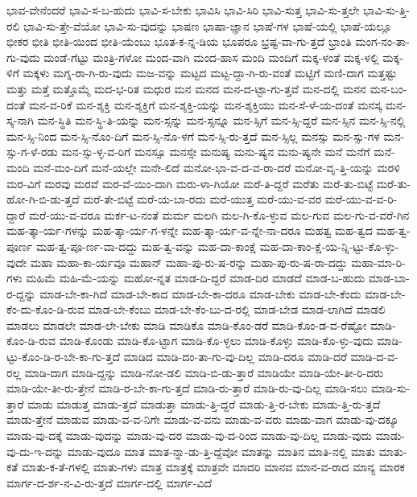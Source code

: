 {ಭಾವ-ವೇನೆಂದರೆ
ಭಾವಿ-ಸ-ಬ-ಹುದು
ಭಾವಿ-ಸ-ಬೇಕು
ಭಾವಿಸಿ
ಭಾವಿ-ಸಿರಿ
ಭಾವಿ-ಸುತ್ತ
ಭಾವಿ-ಸು-ತ್ತಲೇ
ಭಾವಿ-ಸು-ತ್ತಿ-ರಲಿ
ಭಾವಿ-ಸು-ತ್ತೇ-ವೆಯೋ
ಭಾವಿ-ಸು-ವುದನ್ನು
ಭಾಷಣ
ಭಾಷಾ-ಜ್ಞಾನ
ಭಾಷೆ-ಗಳ
ಭಾಷೆ-ಯಲ್ಲಿ
ಭಾಷೆ-ಯಲ್ಲೂ
ಭೀಕರ
ಭೀತಿ
ಭೀತಿ-ಯಿಂದ
ಭೀತಿ-ಯೆಂಬು
ಭೂತ-ಕ-ನ್ನ-ಡಿಯ
ಭೂಪರೂ
ಭ್ರಷ್ಟ-ವಾ-ಗು-ತ್ತದೆ
ಭ್ರಾಂತಿ
ಮಂಗ-ನಂ-ತಾ-ಗು-ವುದು
ಮಂಡೆ-ಗೆಟ್ಟು
ಮಂತ್ರಿ-ಗಳೋ
ಮಂದ-ವಾಗಿ
ಮಂದ-ಹಾಸ
ಮಂದಿ
ಮಂದಿಗೆ
ಮಕ್ಕ-ಳಂತೆ
ಮಕ್ಕ-ಳಲ್ಲಿ
ಮಕ್ಕ-ಳಿಗೆ
ಮಕ್ಕಳು
ಮಗ್ನ-ರಾ-ಗಿ-ರು-ವುದು
ಮಜ-ವನ್ನು
ಮಟ್ಟದ
ಮಟ್ಟ-ದ್ದಾ-ಗಿ-ರು-ವಂತೆ
ಮಟ್ಟಿಗೆ
ಮಣಿ-ದಾಗ
ಮತ್ತಷ್ಟು
ಮತ್ತು
ಮತ್ತೆ
ಮತ್ತೊಮ್ಮೆ
ಮದ-ಭ-ರಿತ
ಮಧುರ
ಮನ
ಮನದ
ಮನ-ದ-ಟ್ಟಾ-ಗು-ತ್ತವೆ
ಮನ-ದಲ್ಲಿ
ಮನನ
ಮನ-ಬಂ-ದಂತೆ
ಮನ-ವ-ರಿಕೆ
ಮನ-ಶ್ಶಕ್ತಿ
ಮನ-ಶ್ಶಕ್ತಿಗೆ
ಮನ-ಶ್ಶಕ್ತಿ-ಯನ್ನು
ಮನ-ಶ್ಶಕ್ತಿಯು
ಮನ-ಸೆ-ಳೆ-ಯ-ದಂತೆ
ಮನಸ್ಕ
ಮನ-ಸ್ಕ-ನಾಗಿ
ಮನ-ಸ್ಥಿತಿ
ಮನ-ಸ್ಥಿ-ತಿ-ಯನ್ನು
ಮನ-ಸ್ಸನ್ನು
ಮನ-ಸ್ಸನ್ನೂ
ಮನ-ಸ್ಸಿಗೆ
ಮನ-ಸ್ಸಿ-ದ್ದರೆ
ಮನ-ಸ್ಸಿನ
ಮನ-ಸ್ಸಿ-ನಲ್ಲಿ
ಮನ-ಸ್ಸಿ-ನಿಂದ
ಮನ-ಸ್ಸಿ-ನೊಂ-ದಿಗೆ
ಮನ-ಸ್ಸಿ-ನೊ-ಳಗೆ
ಮನ-ಸ್ಸಿ-ರು-ತ್ತದೆ
ಮನ-ಸ್ಸಿಲ್ಲ
ಮನಸ್ಸು
ಮನ-ಸ್ಸು-ಗಳ
ಮನ-ಸ್ಸು-ಗ-ಳೆ-ರಡು
ಮನ-ಸ್ಸು-ಳ್ಳ-ವ-ರಿಗೆ
ಮನಸ್ಸೂ
ಮನಸ್ಸೇ
ಮನುಷ್ಯ
ಮನು-ಷ್ಯನ
ಮನು-ಷ್ಯನೇ
ಮನೆ
ಮನೆಗೆ
ಮನೆ-ಮಂದಿ
ಮನೆ-ಮಂ-ದಿಗೆ
ಮನೆ-ಯಲ್ಲೇ
ಮನೇ-ಲಿದೆ
ಮನೋ-ಭಾ-ವ-ದ-ವ-ರಾ-ದರೆ
ಮನೋ-ವೃ-ತ್ತಿ-ಯನ್ನು
ಮರಳಿ
ಮರ-ವಿಗೆ
ಮರವು
ಮರವೆ
ಮರ-ವೆ-ಯಿಂ-ದಾಗಿ
ಮರು-ಳಾ-ಗಿಯೋ
ಮರೆ-ತಿ-ದ್ದರೆ
ಮರೆತು
ಮರೆ-ತು-ಬಿಟ್ಟೆ
ಮರೆ-ತು-ಹೋ-ಗಿ-ಬಿ-ಡು-ತ್ತದೆ
ಮರೆ-ತೇ-ಬಿಟ್ಟೆ
ಮರೆ-ಯ-ಬಾ-ರದು
ಮರೆ-ಯುತ್ತ
ಮರೆ-ಯು-ವ-ವರ
ಮರೆ-ಯು-ವ-ವ-ರಿ-ದ್ದಾರೆ
ಮರೆ-ಯು-ವ-ವರೂ
ಮರ್ಕ-ಟ-ನಂತೆ
ಮರ್ಮ
ಮಲಗಿ
ಮಲ-ಗಿ-ಕೊ-ಳ್ಳುವ
ಮಲ-ಗುವ
ಮಲ-ಗು-ವ-ವರೆ-ಗಿನ
ಮಹ-ತ್ಕಾ-ರ್ಯ-ಗಳನ್ನು
ಮಹ-ತ್ಕಾ-ರ್ಯ-ಗ-ಳನ್ನೇ
ಮಹ-ತ್ಕಾ-ರ್ಯ-ವ-ನ್ನೇ-ನಾ-ದರೂ
ಮಹತ್ವ
ಮಹ-ತ್ವದ
ಮಹ-ತ್ವ-ಪೂರ್ಣ
ಮಹ-ತ್ವ-ಪೂ-ರ್ಣ-ವಾ-ದದ್ದು
ಮಹ-ತ್ವ-ವನ್ನು
ಮಹ-ದಾ-ಕಾಂಕ್ಷೆ
ಮಹ-ದಾ-ಕಾಂ-ಕ್ಷೆ-ಯ-ನ್ನಿ-ಟ್ಟು-ಕೊ-ಳ್ಳು-ವುದೇ
ಮಹಾ
ಮಹಾ-ಕಾ-ರ್ಯವೂ
ಮಹಾನ್
ಮಹಾ-ಪು-ರು-ಷ-ರನ್ನು
ಮಹಾ-ಪು-ರು-ಷ-ರಾ-ದದ್ದು
ಮಹಾ-ಮಾ-ರಿ-ಗಳು
ಮಹಿಮೆ
ಮಹಿ-ಮೆ-ಯನ್ನು
ಮಹೋ-ನ್ನತ
ಮಾಡ-ದಿ-ದ್ದರೆ
ಮಾಡ-ದಿರ
ಮಾಡದೆ
ಮಾಡ-ಬ-ಹುದು
ಮಾಡ-ಬಾ-ರ-ದ್ದನ್ನು
ಮಾಡ-ಬೇ-ಕಾ-ಗಿದೆ
ಮಾಡ-ಬೇ-ಕಾದ
ಮಾಡ-ಬೇ-ಕಾ-ದರೂ
ಮಾಡ-ಬೇಕು
ಮಾಡ-ಬೇ-ಕೆಂದು
ಮಾಡ-ಬೇ-ಕೆಂ-ದು-ಕೊಂ-ಡಿ-ರುವ
ಮಾಡ-ಬೇ-ಕೆಂಬು
ಮಾಡ-ಬೇ-ಕೆಂ-ಬು-ದ-ರಲ್ಲಿ
ಮಾಡ-ಬೇಡ
ಮಾಡ-ಲಾಗಿದೆ
ಮಾಡಲಿ
ಮಾಡಲು
ಮಾಡಲೇ
ಮಾಡ-ಲೇ-ಬೇಕು
ಮಾಡಿ
ಮಾಡಿಕೊ
ಮಾಡಿ-ಕೊಂ-ಡರೆ
ಮಾಡಿ-ಕೊಂ-ಡ-ವ-ರೆಷ್ಟೋ
ಮಾಡಿ-ಕೊಂ-ಡಿ-ರುವ
ಮಾಡಿ-ಕೊಂಡು
ಮಾಡಿ-ಕೊ-ಟ್ಟಾಗ
ಮಾಡಿ-ಕೊ-ಳ್ಳಲು
ಮಾಡಿ-ಕೊಳ್ಳು
ಮಾಡಿ-ಕೊ-ಳ್ಳು-ವುದು
ಮಾಡಿ-ಟ್ಟು-ಕೊಂ-ಡಿ-ರ-ಬೇ-ಕಾ-ಗು-ತ್ತದೆ
ಮಾಡಿದ
ಮಾಡಿ-ದಂ-ತಾ-ಗು-ವು-ದಿಲ್ಲ
ಮಾಡಿ-ದರೂ
ಮಾಡಿ-ದರೆ
ಮಾಡಿ-ದ-ವ-ರಲ್ಲ
ಮಾಡಿ-ದಾಗ
ಮಾಡಿ-ದ್ದನ್ನು
ಮಾಡಿ-ನೋ-ಡಲಿ
ಮಾಡಿ-ಬಿ-ಡು-ತ್ತಾರೆ
ಮಾಡಿಯೇ
ಮಾಡಿ-ಯೇ-ತೀ-ರಿ-ದರು
ಮಾಡಿ-ಯೇ-ತೀ-ರು-ತ್ತೇನೆ
ಮಾಡಿ-ರ-ಬೇ-ಕಾ-ಗು-ತ್ತದೆ
ಮಾಡಿ-ರು-ತ್ತಾರೆ
ಮಾಡಿ-ರು-ವು-ದಿಲ್ಲ
ಮಾಡಿ-ಸಲು
ಮಾಡಿ-ಸು-ತ್ತಾರೆ
ಮಾಡು
ಮಾಡುತ್ತ
ಮಾಡು-ತ್ತದೆ
ಮಾಡುತ್ತಾ
ಮಾಡು-ತ್ತಿ-ದ್ದರೆ
ಮಾಡು-ತ್ತಿ-ರ-ಬೇಕು
ಮಾಡು-ತ್ತಿ-ರು-ತ್ತದೆ
ಮಾಡು-ತ್ತೇನೆ
ಮಾಡುವ
ಮಾಡು-ವ-ವ-ನಿಗೇ
ಮಾಡು-ವ-ವನು
ಮಾಡು-ವ-ವರು
ಮಾಡು-ವಾಗ
ಮಾಡು-ವು-ದಕ್ಕೂ
ಮಾಡು-ವು-ದಕ್ಕೆ
ಮಾಡು-ವುದನ್ನು
ಮಾಡು-ವು-ದರ
ಮಾಡು-ವು-ದ-ರಿಂದ
ಮಾಡು-ವು-ದಿಲ್ಲ
ಮಾಡು-ವುದು
ಮಾಡು-ವು-ದು-ಇ-ದನ್ನು
ಮಾಡು-ವುದೂ
ಮಾತ
ಮಾತ-ನ್ನಾ-ಡು-ತ್ತಿ-ದ್ದೆವೋ
ಮಾತನ್ನು
ಮಾತಿನ
ಮಾತಿ-ನಲ್ಲಿ
ಮಾತು
ಮಾತು-ಕತೆ
ಮಾತು-ಕ-ತೆ-ಗಳಲ್ಲಿ
ಮಾತು-ಗಳು
ಮಾತ್ರ
ಮಾತ್ರಕ್ಕೆ
ಮಾತ್ರವೇ
ಮಾದರಿ
ಮಾನವ
ಮಾನ-ವ-ರಾದ
ಮಾನ್ಯ
ಮಾರಕ
ಮಾರ್ಗ-ದ-ರ್ಶ-ನ-ವಿ-ರು-ತ್ತದೆ
ಮಾರ್ಗ-ದಲ್ಲಿ
ಮಾರ್ಗ-ವಿದೆ
}
